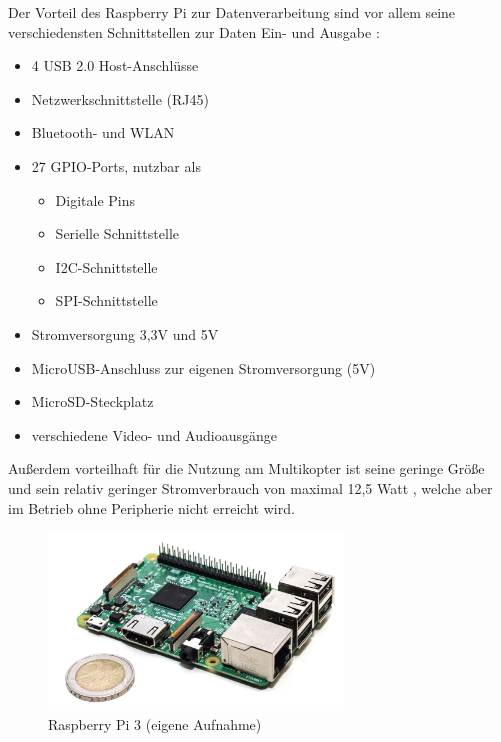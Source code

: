 \documentclass[a4paper,12pt,bibliography=totoc, listof=totoc,titlepage,pointlessnumbers]{scrreprt}
\begin{document}
Der Vorteil des Raspberry Pi zur Datenverarbeitung sind vor allem seine verschiedensten Schnittstellen zur Daten Ein- und Ausgabe \citep{raspSheet}:
\begin{itemize}
 \item 4 USB 2.0 Host-Anschlüsse
 \item Netzwerkschnittstelle (RJ45)
 \item Bluetooth- und WLAN
 \item 27 GPIO-Ports, nutzbar als \citep{ekRaspPin}
 \begin{itemize} 
  \item Digitale Pins
  \item Serielle Schnittstelle
  \item I2C-Schnittstelle
  \item SPI-Schnittstelle
 \end{itemize}
 \item Stromversorgung 3,3V und 5V
 \item MicroUSB-Anschluss zur eigenen Stromversorgung (5V)
 \item MicroSD-Steckplatz 
 \item verschiedene Video- und Audioausgänge
 \end{itemize}

Außerdem vorteilhaft für die Nutzung am Multikopter ist seine geringe Größe und sein relativ geringer Stromverbrauch von maximal 12,5 Watt \citep{raspSheet}, welche aber im Betrieb ohne Peripherie nicht erreicht wird.

\begin{figure}
 \centering
 \includegraphics[width=0.7\textwidth]{./img/rpi3.jpg}
 \caption{Raspberry Pi 3 (eigene Aufnahme)}
 \label{img:rpi3}
\end{figure}
\end{document}
